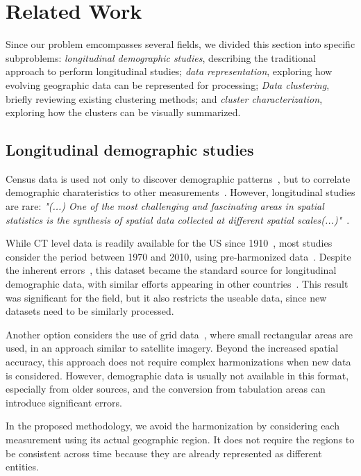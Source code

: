 \section{Related Work}

Since our problem emcompasses several fields, we divided this section into
specific subproblems: \emph{longitudinal demographic studies}, describing the
traditional approach to perform longitudinal studies; \emph{data
representation}, exploring how evolving geographic data can be represented for
processing; \emph{Data clustering}, briefly reviewing existing clustering
methods; and \emph{cluster characterization}, exploring how the clusters can be
visually summarized.

\subsection{Longitudinal demographic studies}
Census data is used not only to discover demographic
patterns~\cite{Firebaugh2016}, but to correlate demographic charateristics to
other measurements~\cite{diez1997neighborhood}. However, longitudinal studies
are rare: \emph{"(...) One of the most challenging and fascinating areas in
spatial statistics is the synthesis of spatial data collected at different
spatial scales(...)"}~\cite{gotway2002combining}.

While CT level data is readily available for the US since 1910~\cite{nhgis},
most studies consider the period between 1970 and 2010, using pre-harmonized
data~\cite{Logan2014,nhgis}. Despite the inherent
errors~\cite{Logan2016,Hallisey2017}, this dataset became the standard source
for longitudinal demographic data, with similar efforts appearing in other
countries~\cite{Liu2015,Lee2015,Allen2018}. This result was significant for the
field, but it also restricts the useable data, since new datasets need to be
similarly processed.


Another option considers the use of grid data~\cite{Dmowska2017,Dmowska2018},
where small rectangular areas are used, in an approach similar to satellite
imagery. Beyond the increased spatial accuracy, this approach does not require
complex harmonizations when new data is considered. However, demographic data is
usually not available in this format, especially from older sources, and the
conversion from tabulation areas can introduce significant errors.

In the proposed methodology, we avoid the harmonization by considering each
measurement using its actual geographic region. It does not require the regions
to be consistent across time because they are already represented as different
entities. 


